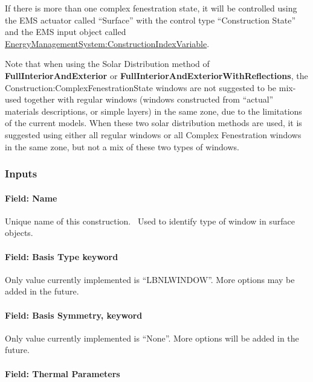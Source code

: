 If there is more than one complex fenestration state, it will be controlled using the EMS actuator called ``Surface'' with the control type ``Construction State'' and the EMS input object called \hyperref[energymanagementsystemconstructionindexvariable]{EnergyManagementSystem:ConstructionIndexVariable}.

Note that when using the Solar Distribution method of \textbf{FullInteriorAndExterior} or \textbf{FullInteriorAndExteriorWithReflections}, the Construction:ComplexFenestrationState windows are not suggested to be mix-used together with regular windows (windows constructed from ``actual'' materials descriptions, or simple layers) in the same zone, due to the limitations of the current models. When these two solar distribution methods are used, it is suggested using either all regular windows or all Complex Fenestration windows in the same zone, but not a mix of these two types of windows.

\subsubsection{Inputs}\label{inputs-39}

\paragraph{Field: Name}\label{field-name-32-000}

Unique name of this construction.~ Used to identify type of window in surface objects.

\paragraph{Field: Basis Type keyword}\label{field-basis-type-keyword}

Only value currently implemented is ``LBNLWINDOW''. More options may be added in the future.

\paragraph{Field: Basis Symmetry, keyword}\label{field-basis-symmetry-keyword}

Only value currently implemented is ``None''. More options will be added in the future.

\paragraph{Field: Thermal Parameters}\label{field-thermal-parameters}

